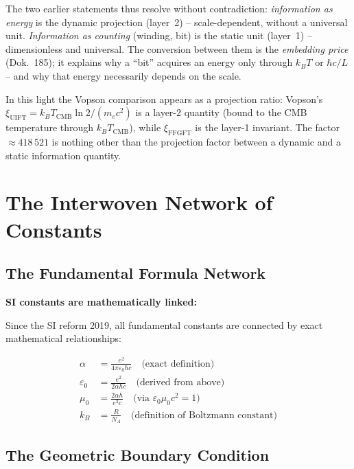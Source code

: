 	The two earlier statements thus resolve without contradiction:
	\emph{information as energy} is the dynamic projection (layer~2) --
	scale-dependent, without a universal unit. \emph{Information as counting}
	(winding, bit) is the static unit (layer~1) -- dimensionless and universal. The
	conversion between them is the \emph{embedding price} (Dok.~185); it explains why
	a ``bit'' acquires an energy only through $k_B T$ or $\hbar c/L$ -- and why that
	energy necessarily depends on the scale.

	In this light the Vopson comparison appears as a projection ratio: Vopson's
	$\xi_{\text{UIFT}} = k_B T_{\text{CMB}} \ln 2 / (m_e c^2)$ is a layer-2 quantity
	(bound to the CMB temperature through $k_B T_{\text{CMB}}$), while
	$\xi_{\text{FFGFT}}$ is the layer-1 invariant. The factor $\approx 418\,521$ is
	nothing other than the projection factor between a dynamic and a static
	information quantity.

	\section{The Interwoven Network of Constants}
	
	\subsection{The Fundamental Formula Network}
	
	\begin{derivation}
		\textbf{SI constants are mathematically linked:}
		
		Since the SI reform 2019, all fundamental constants are connected by exact mathematical relationships:
		
		\begin{align}
			\alpha &= \frac{e^2}{4\pi\varepsilon_0\hbar c} \quad \text{(exact definition)} \\
			\varepsilon_0 &= \frac{e^2}{2\alpha h c} \quad \text{(derived from above)} \\
			\mu_0 &= \frac{2\alpha h}{e^2 c} \quad \text{(via } \varepsilon_0\mu_0c^2 = 1) \\
			k_B &= \frac{R}{N_A} \quad \text{(definition of Boltzmann constant)}
		\end{align}
	\end{derivation}
	
	\subsection{The Geometric Boundary Condition}
	
